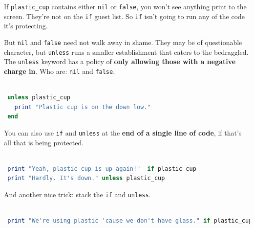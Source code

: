 \documentclass[10pt,twoside]{report}
\begin{document}
If \lstinline[breaklines=true]|plastic_cup| contains either
\lstinline[breaklines=true]|nil| or
\lstinline[breaklines=true]|false|, you won't see anything print to
the screen.  They're not on the \lstinline[breaklines=true]|if| guest
list.  So \lstinline[breaklines=true]|if| isn't going to run any of
the code it's protecting.

But \lstinline[breaklines=true]|nil| and
\lstinline[breaklines=true]|false| need not walk away in shame.  They
may be of questionable character, but
\lstinline[breaklines=true]|unless| runs a smaller establishment that
caters to the bedraggled. The \lstinline[breaklines=true]|unless|
keyword has a policy of {\bf only allowing those with a negative
  charge in}. Who are: \lstinline[breaklines=true]|nil| and
\lstinline[breaklines=true]|false|.


\begin{lstlisting}[basicstyle=\ttfamily\color{basiccolor},
    commentstyle = \ttfamily\color{commentcolor},
    keywordstyle=\ttfamily\color{keywordscolor},
    stringstyle=\color{stringcolor},
    language=Ruby,
    basicstyle=\small\ttfamily,
    showstringspaces=false,
  ]

 unless plastic_cup 
   print "Plastic cup is on the down low."  
 end

\end{lstlisting}


You can also use \lstinline[breaklines=true]|if| and
\lstinline[breaklines=true]|unless| at the {\bf end of a single line
  of code}, if that's all that is being protected.


\begin{lstlisting}[basicstyle=\ttfamily\color{basiccolor},
    commentstyle = \ttfamily\color{commentcolor},
    keywordstyle=\ttfamily\color{keywordscolor},
    stringstyle=\color{stringcolor},
    language=Ruby,
    basicstyle=\small\ttfamily,
    showstringspaces=false,
  ]

 print "Yeah, plastic cup is up again!"  if plastic_cup 
 print "Hardly. It's down." unless plastic_cup

\end{lstlisting}


And another nice trick: stack the \lstinline[breaklines=true]|if| and
\lstinline[breaklines=true]|unless|.


\begin{lstlisting}[basicstyle=\ttfamily\color{basiccolor},
    commentstyle = \ttfamily\color{commentcolor},
    keywordstyle=\ttfamily\color{keywordscolor},
    stringstyle=\color{stringcolor},
    language=Ruby,
    basicstyle=\small\ttfamily,
    showstringspaces=false,
  ]

 print "We're using plastic 'cause we don't have glass." if plastic_cup unless glass_cup

\end{lstlisting}
\end{document}

